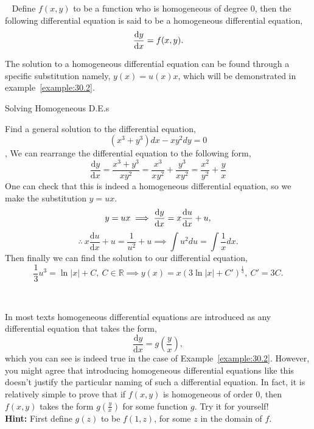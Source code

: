 \begin{definition}{~}\label{definition:30.2}
Define $f(x,y)$ to be a function who is homogeneous of degree $0$, then the following differential equation is said to be a homogeneous differential equation,
$$\dv{y}{x}=f(x,y).$$
\end{definition}

The solution to a homogeneous differential equation can be found through a specific substitution namely, $y(x)=u(x)x$, which will be demonstrated in example~\ref{example:30.2}.

\begin{example}{Solving Homogeneous D.E.s}\label{example:30.2}

Find a general solution to the differential equation,
$$(x^3+y^3)dx-xy^2dy=0$$
\sep
We can rearrange the differential equation to the following form,
$$\frac{\mathrm{d}y}{\mathrm{d}x}=\frac{x^3+y^3}{xy^2}=\frac{x^3}{xy^2}+\frac{y^3}{xy^2}=\frac{x^2}{y^2}+\frac{y}{x}$$
One can check that this is indeed a homogeneous differential equation, so we make the substitution $y=ux$.
$$y=ux \implies \dv{y}{x}=x\dv{u}{x}+u,$$
$$\therefore \ x\frac{\mathrm{d}u}{\mathrm{d}x}+u=\frac{1}{u^2}+u \implies \int u^2 du=\int \frac{1}{x} dx.$$
Then finally we can find the solution to our differential equation,
$$\frac{1}{3}u^3= \ln|x|+C, \ C \in \mathbb{R} \implies y(x)=x \left(3 \ln|x|+C' \right)^\frac{1}{3}, \ C'=3C.$$
\end{example}
\begin{insight}{~}

In most texts homogeneous differential equations are introduced as any differential equation that takes the form,
$$\frac{\mathrm{d}y}{\mathrm{d}x}=g\left(\frac{y}{x}\right),$$
which you can see is indeed true in the case of Example~\ref{example:30.2}. However, you might agree that introducing homogeneous differential equations like this doesn't justify the particular naming of such a differential equation. In fact, it is relatively simple to prove that if $f(x,y)$ is homogeneous of order $0$, then $f(x,y)$ takes the form $g\left(\frac{y}{x}\right)$ for some function $g$. Try it for yourself! \\
\textbf{Hint:} First define $g(z)$ to be $f(1,z)$, for some $z$ in the domain of $f$.

\end{insight}

\newpage

